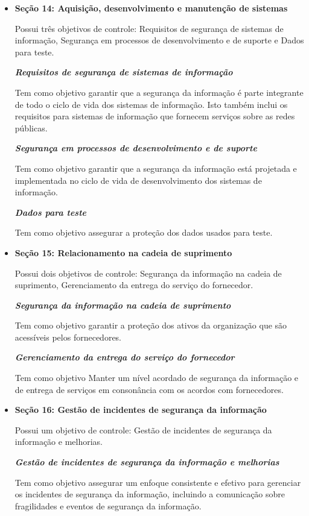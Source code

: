 \begin{itemize}
    \item \textbf{Seção 14: Aquisição, desenvolvimento e manutenção de sistemas}
    
    Possui três objetivos de controle: Requisitos de segurança de sistemas de informação, Segurança em processos de desenvolvimento e de suporte e Dados para teste.
    
    \textit{\textbf{Requisitos de segurança de sistemas de informação}}
    
    Tem como objetivo garantir que a segurança da informação é parte integrante de todo o ciclo de vida dos sistemas de informação. Isto também inclui os requisitos para sistemas de informação que fornecem serviços sobre as redes públicas.
    
   \textit{ \textbf{Segurança em processos de desenvolvimento e de suporte}}
    
    Tem como objetivo garantir que a segurança da informação está projetada e implementada no ciclo de vida de desenvolvimento dos sistemas de informação.
    
  \textit{  \textbf{Dados para teste}}\textit{}
    
    Tem como objetivo assegurar a proteção dos dados usados para teste.
\end{itemize}
\begin{itemize}
    \item \textbf{Seção 15: Relacionamento na cadeia de suprimento}
    
    Possui dois objetivos de controle: Segurança da informação na cadeia de suprimento, Gerenciamento da entrega do serviço do fornecedor.
    
   \textit{ \textbf{Segurança da informação na cadeia de suprimento}}
    
    Tem como objetivo garantir a proteção dos ativos da organização que são acessíveis pelos fornecedores.
    
   \textit{ \textbf{Gerenciamento da entrega do serviço do fornecedor}}
    
    Tem como objetivo Manter um nível acordado de segurança da informação e de entrega de serviços em consonância com os acordos com fornecedores.
\end{itemize}
\begin{itemize}
    \item \textbf{Seção 16: Gestão de incidentes de segurança da informação}
    
    Possui um objetivo de controle: Gestão de incidentes de segurança da informação e melhorias.
    
    \textit{\textbf{Gestão de incidentes de segurança da informação e melhorias}}
    
    Tem como objetivo assegurar um enfoque consistente e efetivo para gerenciar os incidentes de segurança da informação, incluindo a comunicação sobre fragilidades e eventos de segurança da informação.
\end{itemize}
